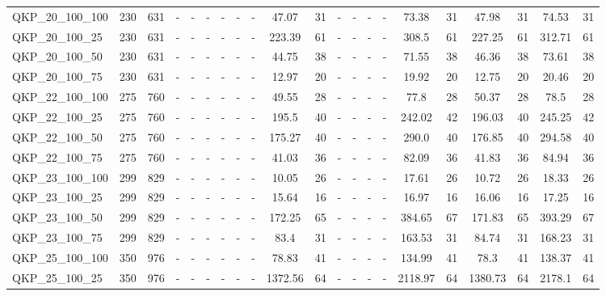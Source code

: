 \begin{sidewaystable}[!ht]
{\begin{tabular}{lcccccccccccccccccccc}
QKP\_20\_100\_100 & 230 & 631 &  - &  - &  - &  - &  - &  - &  \textcolor{blue2}{47.07} & 31 &  - &  - &  - &  - & 73.38 & 31 & 47.98 & 31 & 74.53 & 31 \\
QKP\_20\_100\_25 & 230 & 631 &  - &  - &  - &  - &  - &  - &  \textcolor{blue2}{223.39} & 61 &  - &  - &  - &  - & 308.5 & 61 & 227.25 & 61 & 312.71 & 61 \\
QKP\_20\_100\_50 & 230 & 631 &  - &  - &  - &  - &  - &  - &  \textcolor{blue2}{44.75} & 38 &  - &  - &  - &  - & 71.55 & 38 & 46.36 & 38 & 73.61 & 38 \\
QKP\_20\_100\_75 & 230 & 631 &  - &  - &  - &  - &  - &  - & 12.97 & 20 &  - &  - &  - &  - & 19.92 & 20 &  \textcolor{blue2}{12.75} & 20 & 20.46 & 20 \\
QKP\_22\_100\_100 & 275 & 760 &  - &  - &  - &  - &  - &  - &  \textcolor{blue2}{49.55} & 28 &  - &  - &  - &  - & 77.8 & 28 & 50.37 & 28 & 78.5 & 28 \\
QKP\_22\_100\_25 & 275 & 760 &  - &  - &  - &  - &  - &  - &  \textcolor{blue2}{195.5} & 40 &  - &  - &  - &  - & 242.02 & 42 & 196.03 & 40 & 245.25 & 42 \\
QKP\_22\_100\_50 & 275 & 760 &  - &  - &  - &  - &  - &  - &  \textcolor{blue2}{175.27} & 40 &  - &  - &  - &  - & 290.0 & 40 & 176.85 & 40 & 294.58 & 40 \\
QKP\_22\_100\_75 & 275 & 760 &  - &  - &  - &  - &  - &  - &  \textcolor{blue2}{41.03} & 36 &  - &  - &  - &  - & 82.09 & 36 & 41.83 & 36 & 84.94 & 36 \\
QKP\_23\_100\_100 & 299 & 829 &  - &  - &  - &  - &  - &  - &  \textcolor{blue2}{10.05} & 26 &  - &  - &  - &  - & 17.61 & 26 & 10.72 & 26 & 18.33 & 26 \\
QKP\_23\_100\_25 & 299 & 829 &  - &  - &  - &  - &  - &  - &  \textcolor{blue2}{15.64} & 16 &  - &  - &  - &  - & 16.97 & 16 & 16.06 & 16 & 17.25 & 16 \\
QKP\_23\_100\_50 & 299 & 829 &  - &  - &  - &  - &  - &  - & 172.25 & 65 &  - &  - &  - &  - & 384.65 & 67 &  \textcolor{blue2}{171.83} & 65 & 393.29 & 67 \\
QKP\_23\_100\_75 & 299 & 829 &  - &  - &  - &  - &  - &  - &  \textcolor{blue2}{83.4} & 31 &  - &  - &  - &  - & 163.53 & 31 & 84.74 & 31 & 168.23 & 31 \\
QKP\_25\_100\_100 & 350 & 976 &  - &  - &  - &  - &  - &  - & 78.83 & 41 &  - &  - &  - &  - & 134.99 & 41 &  \textcolor{blue2}{78.3} & 41 & 138.37 & 41 \\
QKP\_25\_100\_25 & 350 & 976 &  - &  - &  - &  - &  - &  - &  \textcolor{blue2}{1372.56} & 64 &  - &  - &  - &  - & 2118.97 & 64 & 1380.73 & 64 & 2178.1 & 64 \\

\end{tabular}}
\end{sidewaystable}
